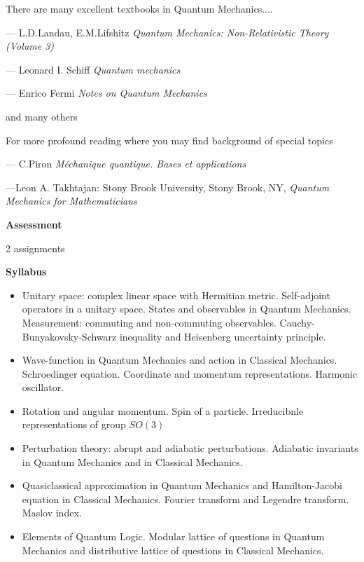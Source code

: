\documentclass[12pt]{article}
\begin{document}
There are many excellent textbooks in Quantum Mechanics....
  

 --- L.D.Landau, E.M.Lifshitz   {\it Quantum Mechanics: 
     Non-Relativistic Theory (Volume 3)}


\smallskip

  --- Leonard I. Schiff {\it Quantum mechanics}

\smallskip

   ---  Enrico Fermi {\it Notes on Quantum Mechanics}

and many others


\medskip

  For more profound reading where you may find background
of special topics 

   --- C.Piron {\it M\'echanique quantique. 
        Bases et applications}

\medskip

    ---Leon A. Takhtajan: 
  Stony Brook University, Stony Brook, NY, 
{\it Quantum Mechanics for Mathematicians}

\bigskip



{\bf Assessment}

2 assignments

\medskip


{\bf Syllabus}

\begin{itemize}

 \item 
Unitary space: complex linear space with Hermitian metric.
Self-adjoint operators in a unitary space. 
States and observables in
Quantum Mechanics. Measurement: 
commuting and non-commuting observables.
Cauchy-Bunyakovsky-Schwarz inequality and Heisenberg uncertainty principle.
 
\item  Wave-function in Quantum Mechanics and action in Classical
Mechanics. Schroedinger equation. Coordinate and momentum
representations. Harmonic oscillator.
 	

\item Rotation and angular momentum. Spin of a particle.
    Irreducibnle representations of group $SO(3)$


\item 
Perturbation theory: abrupt and adiabatic perturbations.
Adiabatic invariants in Quantum Mechanics and in Classical Mechanics.
 

\item Quasiclassical approximation in Quantum Mechanics and
Hamilton-Jacobi equation in Classical Mechanics. 
Fourier transform and
Legendre transform. Maslov index.
 	

\item Elements of Quantum Logic. Modular lattice of questions
in Quantum Mechanics and distributive lattice of
questions in  Classical Mechanics.

\end{itemize}
\end{document}

